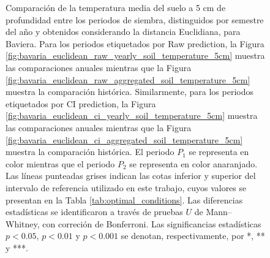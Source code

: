 \begin{figure}[htbp]
	\caption{
		Comparación de la temperatura media del suelo a 5 cm de profundidad entre los periodos de siembra, distinguidos por semestre del año y obtenidos considerando la distancia Euclidiana, para Baviera. Para los periodos etiquetados por Raw prediction, la Figura \ref{fig:bavaria_euclidean_raw_yearly_soil_temperature_5cm} muestra las comparaciones anuales mientras que la Figura \ref{fig:bavaria_euclidean_raw_aggregated_soil_temperature_5cm} muestra la comparación histórica. Similarmente, para los periodos etiquetados por CI prediction, la Figura \ref{fig:bavaria_euclidean_ci_yearly_soil_temperature_5cm} muestra las comparaciones anuales mientras que la Figura \ref{fig:bavaria_euclidean_ci_aggregated_soil_temperature_5cm} muestra la comparación histórica. El periodo $P_1$ se representa en color mientras que el periodo $P_2$ se representa en color anaranjado. Las líneas punteadas grises indican las cotas inferior y superior del intervalo de referencia utilizado en este trabajo, cuyos valores se presentan en la Tabla \ref{tab:optimal_conditions}. Las diferencias estadísticas se identificaron a través de pruebas $U$ de Mann--Whitney, con correción de Bonferroni. Las significancias estadísticas $p<0.05$, $p<0.01$ y $p<0.001$ se denotan, respectivamente, por *, ** y ***.
	}
	\label{fig:bavaria_euclidean_soil_temperature_5cm}
	
	
\end{figure}



